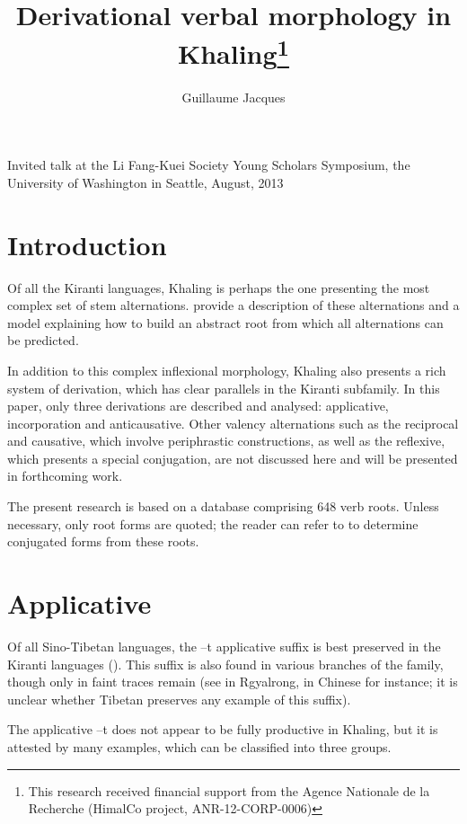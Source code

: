 \documentclass[oldfontcommands,oneside,a4paper,11pt]{article}
\newcommand{\ipa}[1]{{\phon #1}} %
\begin{document}
 


\title{Derivational verbal morphology in Khaling\footnote{This research received financial support from the Agence Nationale de la Recherche (HimalCo project, ANR-12-CORP-0006)  } }
\author{Guillaume Jacques }
\maketitle
Invited talk at the Li Fang-Kuei Society Young Scholars Symposium, the University of Washington in Seattle, August, 2013 

\section{Introduction}
Of all the Kiranti languages, Khaling is perhaps the one presenting the most complex set of stem alternations.  \citet{jacques12khaling} provide a description of these alternations and a model explaining how to build an abstract root  from which all alternations can be predicted.

In addition to this complex inflexional morphology, Khaling also presents a rich system of derivation, which has clear parallels in the Kiranti subfamily. In this paper, only three derivations are described and analysed: applicative, incorporation and anticausative. Other valency alternations such as the reciprocal and causative, which involve periphrastic constructions, as well as the reflexive, which presents a special conjugation, are not discussed here and will be presented in forthcoming work.

 The present research is based on a database comprising 648 verb roots. Unless necessary, only root forms are quoted; the reader can refer to \citet{jacques12khaling} to determine conjugated forms from these roots.

\section{Applicative}
Of all Sino-Tibetan languages, the \ipa{--t} applicative suffix is best preserved in the Kiranti languages (\citealt{michailovsky85dental}). This suffix is also found in various branches of the family, though only in faint traces remain (see \citealt[410]{jacques04these} in Rgyalrong, \citealt{sagart04directions} in Chinese for instance; it is unclear whether Tibetan preserves any example of this suffix).


The applicative \ipa{--t} does not appear to be fully productive in Khaling, but it is attested by many examples, which can be classified into three groups. 
\end{document}
